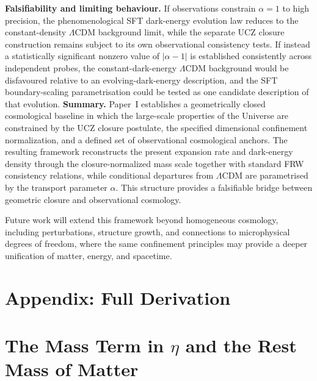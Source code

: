 \documentclass[12pt]{article}
\begin{document}
\medskip
\noindent
\textbf{Falsifiability and limiting behaviour.}  
If observations constrain \(\alpha=1\) to high precision, the
phenomenological SFT dark-energy evolution law reduces to the
constant-density $\Lambda$CDM background limit, while the separate UCZ
closure construction remains subject to its own observational consistency
tests.  
If instead a statistically significant nonzero value of
\(|\alpha-1|\) is established consistently across independent probes,
the constant-dark-energy $\Lambda$CDM background would be disfavoured
relative to an evolving-dark-energy description, and the SFT
boundary-scaling parametrisation could be tested as one candidate
description of that evolution.
\medskip
\noindent
\textbf{Summary.}  
Paper~I establishes a geometrically closed cosmological baseline in which
the large-scale properties of the Universe are constrained by the UCZ
closure postulate, the specified dimensional confinement normalization,
and a defined set of observational cosmological anchors.
The resulting framework reconstructs the present expansion rate and
dark-energy density through the closure-normalized mass scale together
with standard FRW consistency relations, while conditional departures
from $\Lambda$CDM are parametrised by the transport parameter $\alpha$.  
This structure provides a falsifiable bridge between geometric closure and observational cosmology.

\medskip
\noindent
Future work will extend this framework beyond homogeneous cosmology, including perturbations, structure growth, and connections to microphysical degrees of freedom, where the same confinement principles may provide a deeper unification of matter, energy, and spacetime.

\appendix

\section*{Appendix: Full Derivation}
\label{Appendix}


\section{The Mass Term in \texorpdfstring{$\eta$}{η} and the Rest Mass of Matter}
\label{sec:mass_derivation}
\end{document}

